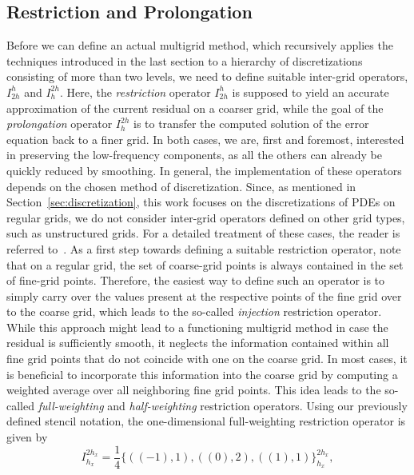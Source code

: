 \subsection{Restriction and Prolongation}
\label{subsec:restriction-and-prolongation}
Before we can define an actual multigrid method, which recursively applies the techniques introduced in the last section to a hierarchy of discretizations consisting of more than two levels, we need to define suitable inter-grid operators, $I_{2h}^{h}$ and $I_{h}^{2h}$.
Here, the \emph{restriction} operator $I_{2h}^{h}$ is supposed to yield an accurate approximation of the current residual on a coarser grid, while the goal of the \emph{prolongation} operator $I_{h}^{2h}$ is to transfer the computed solution of the error equation back to a finer grid.
In both cases, we are, first and foremost, interested in preserving the low-frequency components, as all the others can already be quickly reduced by smoothing.
In general, the implementation of these operators depends on the chosen method of discretization. 
Since, as mentioned in Section~\ref{sec:discretization}, this work focuses on the discretizations of PDEs on regular grids, we do not consider inter-grid operators defined on other grid types, such as unstructured grids.
For a detailed treatment of these cases, the reader is referred to~\cite{trottenberg2000multigrid,ruge1987algebraic,stuben2001introduction}.
As a first step towards defining a suitable restriction operator, note that on a regular grid, the set of coarse-grid points is always contained in the set of fine-grid points.
Therefore, the easiest way to define such an operator is to simply carry over the values present at the respective points of the fine grid over to the coarse grid, which leads to the so-called \emph{injection} restriction operator.
While this approach might lead to a functioning multigrid method in case the residual is sufficiently smooth, it neglects the information contained within all fine grid points that do not coincide with one on the coarse grid.
In most cases, it is beneficial to incorporate this information into the coarse grid by computing a weighted average over all neighboring fine grid points.
This idea leads to the so-called \emph{full-weighting} and \emph{half-weighting} restriction operators.
Using our previously defined stencil notation, the one-dimensional full-weighting restriction operator is given by
\begin{equation}
	I_{h_x}^{2 h_x} = \frac{1}{4}\{((-1), 1), ((0), 2), ((1), 1)\}_{h_x}^{2h_x},
\end{equation} 
